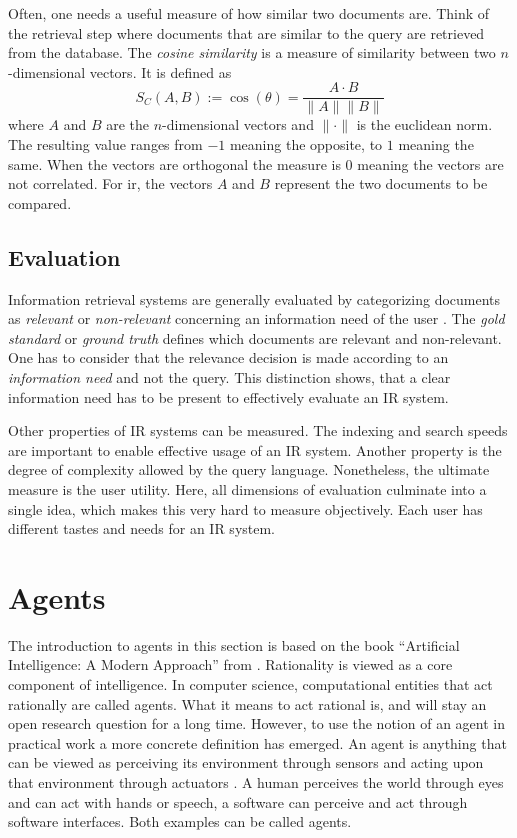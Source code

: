 \documentclass[../main.tex]{subfiles}
\begin{document}
Often, one needs a useful measure of how similar two documents are.
Think of the retrieval step where documents that are similar to the query
are retrieved from the database.
The \emph{cosine similarity} is a measure of similarity
between two $n$-dimensional vectors.
It is defined as
\begin{equation}
    S_C(A,B) := \cos(\theta) = \frac{A \cdot B}{\lVert A \rVert \lVert B \rVert}
\end{equation}
where $A$ and $B$ are the $n$-dimensional vectors and $\lVert \cdot \rVert$ is the
euclidean norm. The resulting value ranges from $-1$ meaning the opposite, to $1$ meaning
the same. When the vectors are orthogonal the measure is $0$ meaning the vectors are not
correlated. For \gls{ir}, the vectors $A$ and $B$ represent the two documents to be compared.


\subsection{Evaluation}

Information retrieval systems are generally evaluated by categorizing documents
as \emph{relevant} or \emph{non-relevant} concerning an information need of the user \cite{Manning2009}.
The \emph{gold standard} or \emph{ground truth} defines which documents are relevant and non-relevant.
One has to consider that the relevance
decision is made according to an \emph{information need} and not the query.
This distinction shows,
that a clear information need has to be present to effectively evaluate an IR system.

Other properties of IR systems can be measured.
The indexing and search speeds are important to enable effective usage of an IR system.
Another property is the degree of complexity allowed by the query language.
Nonetheless, the ultimate measure is the user utility.
Here, all dimensions of evaluation culminate into a single idea,
which makes this very hard to measure objectively.
Each user has different tastes and needs for an IR system.

\section{Agents}
\label{sec:agents}

The introduction to agents in this section is based on the book
``Artificial Intelligence: A Modern Approach'' from \citeauthor{Russel2022} \cite{Russel2022}.
Rationality is viewed as a core component of intelligence.
In computer science, computational entities that act rationally are called agents.
What it means to act rational is, and will stay an open research question for a long time.
However, to use the notion of an agent in practical work a more concrete definition has emerged.
An agent is anything that can be viewed as perceiving its environment through sensors
and acting upon that environment through actuators \cite{Russel2022}.
A human perceives the world through eyes and can act with hands or speech,
a software can perceive and act through software interfaces.
Both examples can be called agents.
\end{document}
